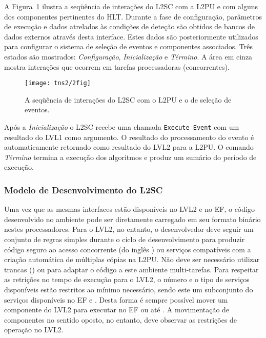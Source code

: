 A Figura~\ref{fig:l2sc-interaction} ilustra a seqüência de interações do L2SC
com a L2PU e com alguns dos componentes pertinentes do HLT. Durante a fase de
configuração, parâmetros de execução e dados atrelados às condições de deteção
são obtidos de bancos de dados externos através desta interface. Estes dados
são posteriormente utilizados para configurar o sistema de seleção de eventos
e componentes associados. Três estados são mostrados: \textit{Configuração},
\textit{Inicialização} e \textit{Término}. A área em cinza mostra interações
que ocorrem em tarefas processadoras (concorrentes).

\begin{figure}
\begin{center}
\texttt{[image: tns2/2fig]}
\end{center}
\caption{A seqüência de interações do L2SC com o L2PU e o  de
seleção de eventos.}
\label{fig:l2sc-interaction}
\end{figure}

Após a \textit{Inicialização} o L2SC recebe uma chamada \texttt{Execute Event}
com um resultado do LVL1 como argumento. O resultado do processamento do
evento é automaticamente retornado como resultado do LVL2 para a L2PU. O
comando \textit{Término} termina a execução dos algoritmos e produz um sumário
do período de execução.

\subsubsection{Modelo de Desenvolvimento do L2SC}

Uma vez que as mesmas interfaces estão disponíveis no LVL2 e no EF, o código
desenvolvido no ambiente  pode ser diretamente carregado em seu
formato binário nestes processadores. Para o LVL2, no entanto, o desenvolvedor
deve seguir um conjunto de regras simples \cite{aa:lvl2-coding} durante o
ciclo de desenvolvimento para produzir código seguro ao acesso concorrente (do
inglês ) ou serviços compatíveis com a criação automática de
múltiplas cópias na L2PU. Não deve ser necessário utilizar trancas
() ou  para adaptar o código a este ambiente
multi-tarefas. Para respeitar as retrições no tempo de execução para o LVL2, o
número e o tipo de serviços disponíveis estão restritos ao mínimo necessário,
sendo este um subconjunto do serviços disponíveis no EF e . Desta
forma é sempre possível mover um componente do LVL2 para executar no EF ou até
. A movimentação de componentes no sentido oposto, no entanto,
deve observar as restrições de operação no LVL2. 

